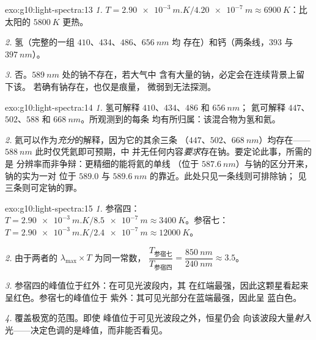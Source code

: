 \begin{solution}{exo:g10:light-spectra:13}
\emph{1.} $T = \qty{2.90e-3}{m.K} / \qty{4.20e-7}{m} \approx
\qty{6900}{K}$：比太阳的 $\qty{5800}{K}$ 更热。

\emph{2.} 氢（完整的一组 $410$、$434$、$486$、$\qty{656}{nm}$ 均
存在）和钙（两条线，$393$ 与 $\qty{397}{nm}$）。

\emph{3.} 否。$\qty{589}{nm}$ 处的钠不存在，若大气中
含有大量的钠，必定会在连续背景上留下该。
若确有钠存在，也仅是痕量，
微弱到无法探测。
\end{solution}

\begin{solution}{exo:g10:light-spectra:14}
\emph{1.} 氢可解释 $410$、$434$、$486$ 和 $\qty{656}{nm}$；
氦可解释 $447$、$502$、$588$ 和 $\qty{668}{nm}$。所观测到的每条
均有所归属：该混合物为氢和氦。

\emph{2.} 氦可以作为\emph{充分}的解释，因为它的其余三条
（$447$、$502$、$\qty{668}{nm}$）均存在——
$\qty{588}{nm}$ 此时仅凭氦即可预期，中
并无任何内容\emph{要求}存在钠。要定论此事，所需的是
分辨率而非争辩：更精细的能将氦的单线
（位于 $\qty{587.6}{nm}$）与钠的区分开来，钠的实为一对
位于 $589.0$ 与 $\qty{589.6}{nm}$ 的靠近。此处只见一条线则可排除钠；
见三条则可定钠的罪。
\end{solution}

\begin{solution}{exo:g10:light-spectra:15}
\emph{1.} 参宿四：
$T = \qty{2.90e-3}{m.K} / \qty{8.5e-7}{m} \approx \qty{3400}{K}$。参宿七：
$T = \qty{2.90e-3}{m.K} / \qty{2.4e-7}{m} \approx \qty{12000}{K}$。

\emph{2.} 由于两者的 $\lambda_{\max} \times T$ 为同一常数，
$\dfrac{T_{\text{参宿七}}}{T_{\text{参宿四}}}
= \dfrac{\qty{850}{nm}}{\qty{240}{nm}} \approx 3.5$。

\emph{3.} 参宿四的峰值位于红外：在可见光波段内，其
在红端最强，因此这颗星看起来呈红色。参宿七的峰值位于
紫外：其可见光部分在蓝端最强，因此呈
蓝白色。

\emph{4.} 覆盖极宽的范围。即使
峰值位于可见光波段之外，恒星仍会
向该波段大量\emph{射入}光——决定色调的是峰值，而非能否看见。
\end{solution}

